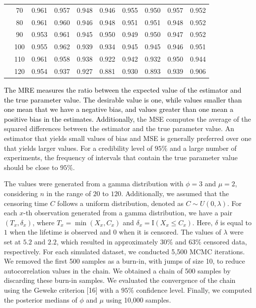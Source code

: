 \documentclass[]{interact}
\theoremstyle{plain}%
\theoremstyle{definition}
\theoremstyle{remark}
\begin{document}
\begin{table}[!h]
\begin{tabular}{c|c|c|c|c|c|c|c|c|c}
&  70 & 0.961 & 0.957 & 0.948 & 0.946 & 0.955 & 0.950 & 0.957 & 0.952 \\
&  80 & 0.961 & 0.960 & 0.946 & 0.948 & 0.951 & 0.951 & 0.948 & 0.952 \\
&  90 & 0.953 & 0.961 & 0.945 & 0.950 & 0.949 & 0.950 & 0.947 & 0.952 \\
&  100 & 0.955 & 0.962 & 0.939 & 0.934 & 0.945 & 0.945 & 0.946 & 0.951 \\
&  110 & 0.961 & 0.958 & 0.938 & 0.922 & 0.942 & 0.932 & 0.950 & 0.944 \\
&  120 & 0.954 & 0.937 & 0.927 & 0.881 & 0.930 & 0.893 & 0.939 & 0.906 \\ \hline
\hline
\end{tabular}
\label{tableres3}
\end{table}

\textcolor{black}{The MRE measures the ratio between the expected value of the estimator and the true parameter value. The desirable value is one, while values smaller than one mean that we have a negative bias, and values greater than one mean a positive bias in the estimates. Additionally,} the MSE computes the average of the squared differences between the estimator and the true parameter value. An estimator that yields small values of bias and MSE is generally preferred over one that yields larger values. For a credibility level of $95\%$ and a large number of experiments, the frequency of intervals that contain the true parameter value should be close to $95\%$.

The values were generated from a gamma distribution with $\phi=3$ and $\mu=2$, considering $n$ in the range of $20$ to $120$. Additionally, we assumed that the censoring time $C$ follows a uniform distribution, denoted as $C \sim U(0,\lambda)$. For each $x$-th observation generated from a gamma distribution, we have a pair $(T_x, \delta_x)$, where $T_x = \min (X_x, C_x)$ and $\delta_x = \mathrm{I}(X_x \leq C_x)$. Here, $\delta$ is equal to $1$ when the lifetime is observed and $0$ when it is censored. The values of $\lambda$ were set at $5.2$ and $2.2$, which resulted in approximately $30\%$ and $63\%$ censored data, respectively. For each simulated dataset, we conducted 5,500 MCMC iterations. We removed the first 500 samples as a burn-in, with jumps of size 10, to reduce autocorrelation values in the chain. We obtained a chain of 500 samples by discarding these burn-in samples. We evaluated the convergence of the chain using the Geweke criterion [16] with a $95\%$ confidence level. Finally, we computed the posterior medians of $\phi$ and $\mu $ using 10,000 samples.
\end{document}
